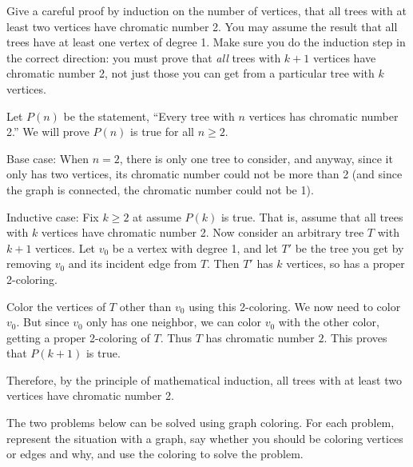 \documentclass[10pt]{exam}
\begin{document}
\begin{questions}
\question[6] Give a careful proof by induction on the number of vertices, that all trees with at least two vertices have chromatic number 2.  You may assume the result that all trees have at least one vertex of degree 1.  Make sure you do the induction step in the correct direction: you must prove that \emph{all} trees with $k+1$ vertices have chromatic number 2, not just those you can get from a particular tree with $k$ vertices.

\begin{solution}
  Let $P(n)$ be the statement, ``Every tree with $n$ vertices has chromatic number 2.''  We will prove $P(n)$ is true for all $n \ge 2$.

  Base case: When $n = 2$, there is only one tree to consider, and anyway, since it only has two vertices, its chromatic number could not be more than 2 (and since the graph is connected, the chromatic number could not be 1).

  Inductive case: Fix $k \ge 2$ at assume $P(k)$ is true.  That is, assume that all trees with $k$ vertices have chromatic number 2.  Now consider an arbitrary tree $T$ with $k+1$ vertices.  Let $v_0$ be a vertex with degree 1, and let $T'$ be the tree you get by removing $v_0$ and its incident edge from $T$.  Then $T'$ has $k$ vertices, so has a proper 2-coloring.

  Color the vertices of $T$ other than $v_0$ using this 2-coloring.  We now need to color $v_0$.  But since $v_0$ only has one neighbor, we can color $v_0$ with the other color, getting a proper 2-coloring of $T$.  Thus $T$ has chromatic number $2$.  This proves that $P(k+1)$ is true.

  Therefore, by the principle of mathematical induction, all trees with at least two vertices have chromatic number 2.
\end{solution}


  \question[6] The two problems below can be solved using graph coloring.  For each problem, represent the situation with a graph, say whether you should be coloring vertices or edges and why, and use the coloring to solve the problem.
\end{questions}
\end{document}
